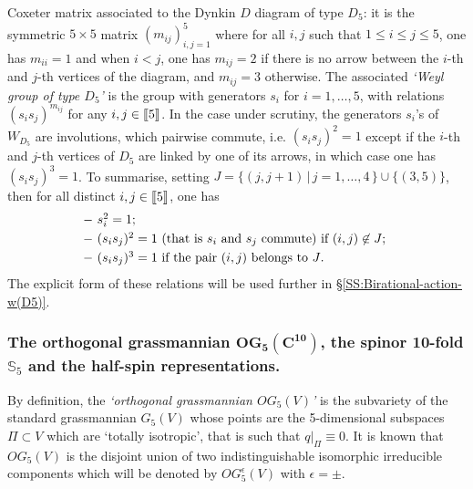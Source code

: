 \documentclass[11pt]{amsart}
\newcommand{\sk}{\smallskip}
\begin{document}
Coxeter matrix associated to the Dynkin $D$ diagram of type $D_5$: it is the symmetric $5\times 5$ matrix $(m_{ij})_{i,j=1}^5$  where for all $i,j$ such that $1\leq i\leq j \leq  5$, one has $m_{ii}=1$ and when $i<j$, one has $m_{ij}=2$ if there is no arrow between the $i$-th and  $j$-th vertices of the diagram, and $m_{ij}=3$ otherwise.  
The associated {\it `Weyl group of type $D_5$'} is the group with generators $s_i$ for $i=1,\ldots,5$, with relations $(s_is_j)^{m_{ij}}$ for any $i,j\in [\hspace{-0.05cm}[5 
]\hspace{-0.05cm}]$. In the case under scrutiny, the generators $s_i$'s of $W_{D_5}$ are  involutions, which pairwise commute, i.e. $(s_is_j)^2=1$ except if the $i$-th and $j$-th vertices of $D_5$ are linked by one of its arrows, in which case one has 
$(s_is_j)^3=1$.  To summarise, setting $J=\{ (j,j+1)\, \lvert \, j=1,\ldots,4\,\} \cup \{ (3,5)  \}$, then for all  distinct $i,j\in  [\hspace{-0.05cm}[5 
]\hspace{-0.05cm}]$, one has 
\begin{equation}
\label{Eq:relations-W(D5)}
\begin{tabular}{l}
$-$  $s_i^2=1$; %
\sk\\
$-$ $(s_is_j)^2=1$ (that is $s_i$ and $s_j$ commute) if $(i,j) \not \in J$; \sk 
\\
$-$ $(s_is_j)^3=1$ if the pair $(i,j)$ belongs to $ J$. 
\end{tabular}
\end{equation}
The explicit form of these relations will be used further in \S\ref{SS:Birational-action-w(D5)}. 



\subsubsection{\bf The orthogonal grassmannian $\boldsymbol{OG_5(\mathbf C^{10})}$, the spinor 10-fold $\boldsymbol{\mathbb S}_{5}$
and the  half-spin representations.}
By definition, the {\it `orthogonal grassmannian $OG_5(V)$'} is the subvariety of the standard grassmannian $G_5(V)$ whose points are the 5-dimensional subspaces $\Pi\subset V$ which are `totally isotropic', that is such that $q\lvert_\Pi\equiv 0$. It is known that $OG_5(V)$ is the disjoint union of two indistinguishable isomorphic irreducible components which will be denoted by $OG_5^\epsilon(V)$ with $\epsilon=\pm$. 
\end{document}
